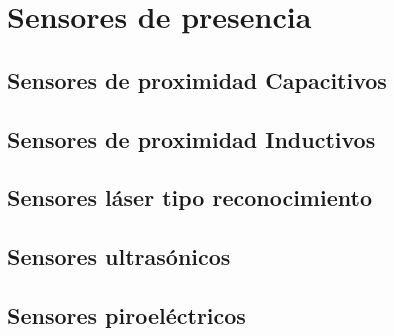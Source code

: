 %

\section{Sensores de presencia}

\subsection{Sensores de proximidad Capacitivos}


\subsection{Sensores de proximidad Inductivos}


\subsection{Sensores láser tipo reconocimiento}


\subsection{Sensores ultrasónicos}


\subsection{Sensores piroeléctricos}

